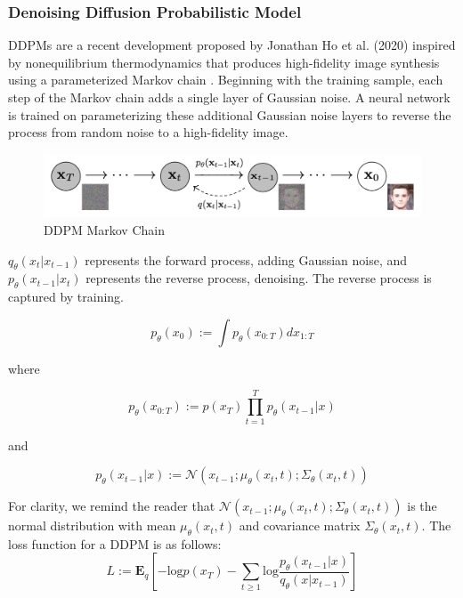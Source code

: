 \documentclass[%
 reprint,
 amsmath,amssymb,
 aps,
]{revtex4-2}
\begin{document}
\subsubsection{Denoising Diffusion Probabilistic Model}

DDPMs are a recent development proposed by Jonathan Ho et al. (2020) inspired by nonequilibrium thermodynamics that produces high-fidelity image synthesis using a parameterized Markov chain \cite{ho2020denoising}. Beginning with the training sample, each step of the Markov chain adds a single layer of Gaussian noise. A neural network is trained on parameterizing these additional Gaussian noise layers to reverse the process from random noise to a high-fidelity image.

\begin{figure}[h]
    \includegraphics[width=0.9\columnwidth]{ddpm.png}
    \caption{\label{fig:vae}DDPM Markov Chain \cite{ho2020denoising}}
\end{figure}


$q_\theta(x_t|x_{t-1} )$  represents the forward process, adding Gaussian noise, and $p_\theta(x_{t-1}|x_t )$ represents the reverse process, denoising. The reverse process is captured by training.

\begin{equation}
p_\theta(x_0) :=\int p_\theta(x_{0:T} ) dx_{1:T}
\end{equation}

where

\begin{equation}
p_\theta(x_{0:T}) := p(x_T)\prod_{t=1}^{T} p_\theta(x_{t-1}|x)
\end{equation}

and

\begin{equation}
p_\theta(x_{t-1}|x) := \mathcal{N}(x_{t-1};\mu_\theta(x_t,t); \Sigma_\theta(x_t,t))
\end{equation}

For clarity, we remind the reader that $\mathcal{N}(x_{t-1};\mu_\theta(x_t,t); \Sigma_\theta(x_t,t))$ is the normal distribution with mean $\mu_\theta(x_t,t)$ and covariance matrix $\Sigma_\theta(x_t,t)$. The loss function for a DDPM is as follows:
\begin{equation}
L := \mathbf{E}_q[-\mathrm{log} p(x_T) - \sum_{t\ge1}\mathrm{log} \frac{p_\theta(x_{t-1}|x )}{q_\theta(x|x_{t-1} )}]
\end{equation}
\end{document}
